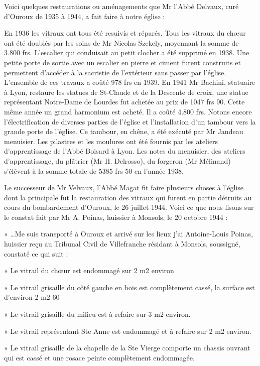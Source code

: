 Voici quelques restaurations ou aménagements que Mr l'Abbé Delvaux, curé d'Ouroux de 1935 à 1944, a fait faire à notre église :

En 1936 les vitraux ont tous été resuivis et réparés. Tous les vitraux du chœur ont été doublés par les soins de Mr Nicolas Szekely, moyennant la somme de 3.800 frs. L'escalier qui conduisait au petit clocher a été supprimé en 1938. Une petite porte de sortie avec un escalier en pierre et ciment furent construits et permettent d'accéder à la sacristie de l'extérieur sans passer par l'église. L'ensemble de ces travaux a coûté 978 frs en 1939. En 1941 Mr Bachini, statuaire à Lyon, restaure les statues de St-Claude et de la Descente de croix, une statue représentant Notre-Dame de Lourdes fut achetée au prix de 1047 frs 90. Cette même année un grand harmonium est acheté. Il a coûté 4.800 frs. Notons encore l'électrification de diverses parties de l'église et l'installation d'un
tambour vers la grande porte de l'église. Ce tambour, en chêne, a été exécuté par Mr Jandeau menuisier. Les pilastres et les moulures ont été fournis par les ateliers d'apprentissage de l'Abbé Boisard à Lyon. Les notes du menuisier, des ateliers d'apprentissage, du plâtrier (Mr H. Delrosso), du forgeron (Mr Mélinand) s'élèvent à la somme totale de 5385 frs 50 en l'année 1938.

Le successeur de Mr Velvaux, l'Abbé Magat fit faire plusieurs choses à l'église dont la principale fut la restauration des vitraux qui furent en partie détruits au cours du bombardement d'Ouroux, le 26 juillet 1944. Voici ce que nous lisons sur le constat fait par Mr A. Poinas, huissier à Monsols, le 20 octobre 1944 :

« …Me suis transporté à Ouroux et arrivé sur les lieux j'ai Antoine-Louis Poinas, huissier reçu au Tribunal Civil de Villefranche résidant à Monsols, soussigné, constaté ce qui suit :

« Le vitrail du chœur est endommagé sur 2 m2 environ

« Le vitrail grisaille du côté gauche en bois est complètement cassé, la surface est d'environ 2 m2 60

« Le vitrail grisaille du milieu est à refaire sur 3 m2 environ.

« Le vitrail représentant Ste Anne est endommagé et à refaire sur 2 m2 environ.

« Le vitrail grisaille de la chapelle de la Ste Vierge comporte un chassis ouvrant qui est cassé et une rosace peinte complètement endommagée.


